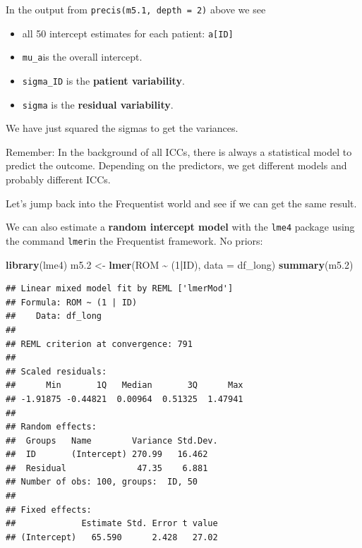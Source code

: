 \documentclass[
]{book}
\newenvironment{Shaded}{\begin{snugshade}}{\end{snugshade}}
\newcommand{\AttributeTok}[1]{\textcolor[rgb]{0.13,0.29,0.53}{#1}}
\newcommand{\DecValTok}[1]{\textcolor[rgb]{0.00,0.00,0.81}{#1}}
\newcommand{\FloatTok}[1]{\textcolor[rgb]{0.00,0.00,0.81}{#1}}
\newcommand{\FunctionTok}[1]{\textcolor[rgb]{0.13,0.29,0.53}{\textbf{#1}}}
\newcommand{\NormalTok}[1]{#1}
\newcommand{\OtherTok}[1]{\textcolor[rgb]{0.56,0.35,0.01}{#1}}
\newcommand{\SpecialCharTok}[1]{\textcolor[rgb]{0.81,0.36,0.00}{\textbf{#1}}}
\providecommand{\tightlist}{%
  \setlength{\itemsep}{0pt}\setlength{\parskip}{0pt}}
\begin{document}
In the output from \texttt{precis(m5.1,\ depth\ =\ 2)} above we see

\begin{itemize}
\tightlist
\item
  all 50 intercept estimates for each patient: \texttt{a{[}ID{]}}
\item
  \texttt{mu\_a}is the overall intercept.
\item
  \texttt{sigma\_ID} is the \textbf{patient variability}.
\item
  \texttt{sigma} is the \textbf{residual variability}.
\end{itemize}

We have just squared the sigmas to get the variances.

Remember: In the background of all ICCs, there is always a statistical model to predict
the outcome. Depending on the predictors, we get different models and
probably different ICCs.

Let's jump back into the Frequentist world and see if we can get the same result.

We can also estimate a \textbf{random intercept model} with the \texttt{lme4} package using
the command \texttt{lmer}in the Frequentist framework. No priors:

\begin{Shaded}
\begin{Highlighting}[]
\FunctionTok{library}\NormalTok{(lme4)}
\NormalTok{m5}\FloatTok{.2} \OtherTok{\textless{}{-}} \FunctionTok{lmer}\NormalTok{(ROM }\SpecialCharTok{\textasciitilde{}}\NormalTok{ (}\DecValTok{1}\SpecialCharTok{|}\NormalTok{ID), }\AttributeTok{data =}\NormalTok{ df\_long)}
\FunctionTok{summary}\NormalTok{(m5}\FloatTok{.2}\NormalTok{)}
\end{Highlighting}
\end{Shaded}

\begin{verbatim}
## Linear mixed model fit by REML ['lmerMod']
## Formula: ROM ~ (1 | ID)
##    Data: df_long
## 
## REML criterion at convergence: 791
## 
## Scaled residuals: 
##      Min       1Q   Median       3Q      Max 
## -1.91875 -0.44821  0.00964  0.51325  1.47941 
## 
## Random effects:
##  Groups   Name        Variance Std.Dev.
##  ID       (Intercept) 270.99   16.462  
##  Residual              47.35    6.881  
## Number of obs: 100, groups:  ID, 50
## 
## Fixed effects:
##             Estimate Std. Error t value
## (Intercept)   65.590      2.428   27.02
\end{verbatim}
\end{document}
